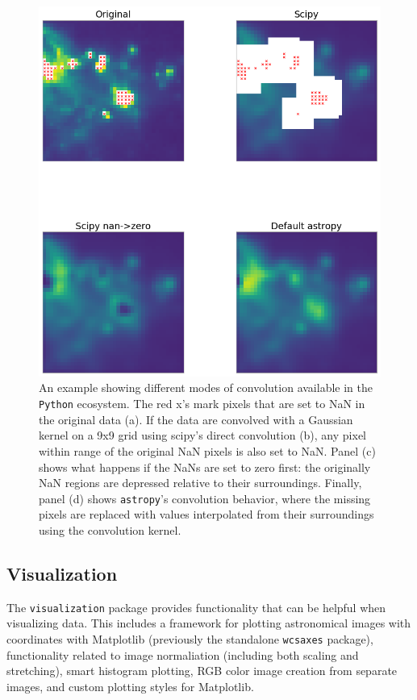 \documentclass[modern]{aastex61}
\newcommand{\package}[1]{\texttt{#1}\xspace}
\newcommand{\python}{\package{Python}\xspace}
\newcommand{\astropypkg}{\package{astropy}\xspace}
\begin{document}
\begin{figure}
\includegraphics[width=\textwidth]{convolution_example.png}
An example showing different modes of convolution available in the \python ecosystem.  The red x's mark pixels that are set to NaN in the original data (a).  If the data are convolved with a Gaussian kernel on a 9x9 grid using scipy's direct convolution (b), any pixel within range of the original NaN pixels is also set to NaN.  Panel (c) shows what happens if the NaNs are set to zero first: the originally NaN regions are depressed relative to their surroundings.  Finally, panel (d) shows \astropypkg's convolution behavior, where the missing pixels are replaced with values interpolated from their surroundings using the convolution kernel.
\label{fig:convolution-example}
\end{figure}


\subsection{Visualization}

The \package{visualization} package provides functionality that can be helpful when visualizing data. This includes a framework for plotting astronomical images with coordinates with Matplotlib (previously the standalone \package{wcsaxes} package), functionality related to image normaliation (including both scaling and stretching), smart histogram plotting, RGB color image creation from separate images, and custom plotting styles for Matplotlib.
\end{document}
